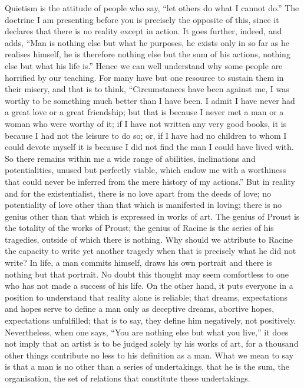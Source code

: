 \documentclass[12pt]{article}
\begin{document}
Quietism is the attitude of people who say, “let others do what I cannot do.” The doctrine I am presenting before you is precisely the opposite of this, since it declares that there is no reality except in action. It goes further, indeed, and adds, “Man is nothing else but what he purposes, he exists only in so far as he realises himself, he is therefore nothing else but the sum of his actions, nothing else but what his life is.” Hence we can well understand why some people are horrified by our teaching. For many have but one resource to sustain them in their misery, and that is to think, “Circumstances have been against me, I was worthy to be something much better than I have been. I admit I have never had a great love or a great friendship; but that is because I never met a man or a woman who were worthy of it; if I have not written any very good books, it is because I had not the leisure to do so; or, if I have had no children to whom I could devote myself it is because I did not find the man I could have lived with. So there remains within me a wide range of abilities, inclinations and potentialities, unused but perfectly viable, which endow me with a worthiness that could never be inferred from the mere history of my actions.” But in reality and for the existentialist, there is no love apart from the deeds of love; no potentiality of love other than that which is manifested in loving; there is no genius other than that which is expressed in works of art. The genius of Proust is the totality of the works of Proust; the genius of Racine is the series of his tragedies, outside of which there is nothing. Why should we attribute to Racine the capacity to write yet another tragedy when that is precisely what he did not write? In life, a man commits himself, draws his own portrait and there is nothing but that portrait. No doubt this thought may seem comfortless to one who has not made a success of his life. On the other hand, it puts everyone in a position to understand that reality alone is reliable; that dreams, expectations and hopes serve to define a man only as deceptive dreams, abortive hopes, expectations unfulfilled; that is to say, they define him negatively, not positively. Nevertheless, when one says, “You are nothing else but what you live,” it does not imply that an artist is to be judged solely by his works of art, for a thousand other things contribute no less to his definition as a man. What we mean to say is that a man is no other than a series of undertakings, that he is the sum, the organisation, the set of relations that constitute these undertakings.
\end{document}
